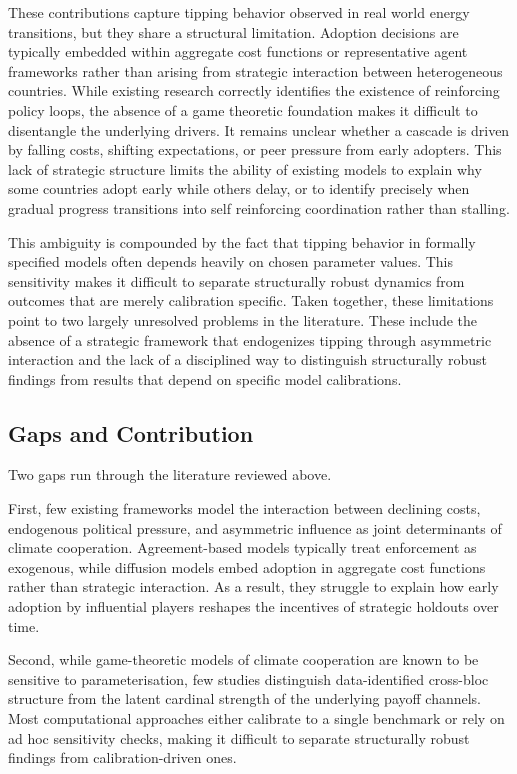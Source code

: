 \documentclass[12pt,a4paper]{article}
\begin{document}
These contributions capture tipping behavior observed in real world energy transitions, but they share a structural limitation. Adoption decisions are typically embedded within aggregate cost functions or representative agent frameworks rather than arising from strategic interaction between heterogeneous countries. While existing research correctly identifies the existence of reinforcing policy loops, the absence of a game theoretic foundation makes it difficult to disentangle the underlying drivers. It remains unclear whether a cascade is driven by falling costs, shifting expectations, or peer pressure from early adopters. This lack of strategic structure limits the ability of existing models to explain why some countries adopt early while others delay, or to identify precisely when gradual progress transitions into self reinforcing coordination rather than stalling.

This ambiguity is compounded by the fact that tipping behavior in formally specified models often depends heavily on chosen parameter values. This sensitivity makes it difficult to separate structurally robust dynamics from outcomes that are merely calibration specific. Taken together, these limitations point to two largely unresolved problems in the literature. These include the absence of a strategic framework that endogenizes tipping through asymmetric interaction and the lack of a disciplined way to distinguish structurally robust findings from results that depend on specific model calibrations.

\subsection{Gaps and Contribution}

Two gaps run through the literature reviewed above.

First, few existing frameworks model the interaction between declining costs, endogenous political pressure, and asymmetric influence as joint determinants of climate cooperation. Agreement-based models typically treat enforcement as exogenous, while diffusion models embed adoption in aggregate cost functions rather than strategic interaction. As a result, they struggle to explain how early adoption by influential players reshapes the incentives of strategic holdouts over time.

Second, while game-theoretic models of climate cooperation are known to be sensitive to parameterisation, few studies distinguish data-identified cross-bloc structure from the latent cardinal strength of the underlying payoff channels. Most computational approaches either calibrate to a single benchmark or rely on ad hoc sensitivity checks, making it difficult to separate structurally robust findings from calibration-driven ones.
\end{document}
